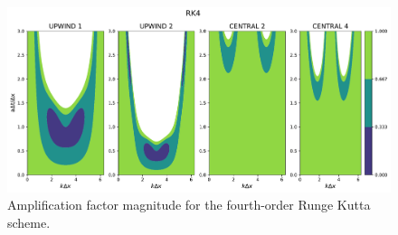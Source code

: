 \documentclass{article}
\begin{document}
\begin{figure}[htbp]
    \centering
    \includegraphics[width=0.8\linewidth]{./vn_rk4.pdf} %
    \caption{Amplification factor magnitude for the fourth-order Runge Kutta scheme.}
    \label{fig:vn_rk4} %
\end{figure}








\end{document}
